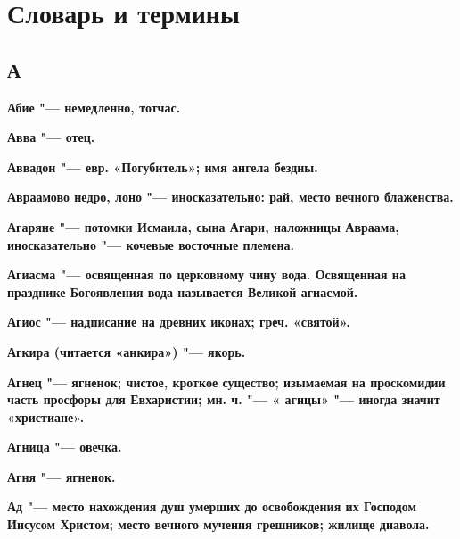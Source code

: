 \SetupCutAtSection

\chapter{Словарь и термины}
 
\begin{mymulticols}{2}\footnotesize

\section{А}


\bfseries Абие\normalfont{} "--- немедленно, тотчас. 




\bfseries Авва\normalfont{} "--- отец. 




\bfseries Аввадон\normalfont{} "--- евр. «Погубитель»; имя ангела бездны. 




\bfseries Авраамово недро, лоно\normalfont{} "--- иносказательно: рай, место вечного блаженства. 




\bfseries Агаряне\normalfont{} "--- потомки Исмаила, сына Агари, наложницы Авраама, иносказательно "--- кочевые восточные племена. 




\bfseries Агиасма\normalfont{} "--- освященная по церковному чину вода. Освященная на празднике Богоявления вода называется Великой агиасмой. 




\bfseries Агиос\normalfont{} "--- надписание на древних иконах; греч. «святой». 




\bfseries Агкира\normalfont{} (читается «анкира») "--- якорь. 




\bfseries Агнец\normalfont{} "--- ягненок; чистое, кроткое существо; изымаемая на проскомидии часть просфоры для Евхаристии; мн. ч. "--- « \bfseries агнцы\normalfont{}» "--- иногда значит «христиане». 




\bfseries Агница\normalfont{} "--- овечка. 




\bfseries Агня\normalfont{} "--- ягненок. 




\bfseries Ад\normalfont{} "--- место нахождения душ умерших до освобождения их Господом Иисусом Христом; место вечного мучения грешников; жилище диавола. 





\end{mymulticols}
